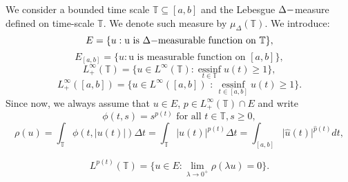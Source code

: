 \documentclass[12pt,a4paper,oneside,titlepage]{article}
\newcommand{\essinf}{\operatorname{essinf}\limits}
\begin{document}
We consider a bounded time scale $\mathbb{T} \subseteq [a,b]$ and the Lebesgue $\Delta \-- $measure defined on time-scale $\mathbb{T}$.
We denote such measure by $\mu_{\Delta}(\mathbb{T})$. We introduce:
\begin{equation}
\label{E_space}
E = \lbrace u :  \text{u is $\Delta \-- $measurable function on }   \mathbb{T} \rbrace ,
\end{equation}
\begin{equation}
 E_{[a,b]} = \lbrace u : \text{u is measurable function on } [a,b] \rbrace  ,
\end{equation}
\begin{equation}
\label{L_niesk}
 L^{\infty}_{+}(\mathbb{T}) = \lbrace u \in L^{\infty}({\mathbb{T}}):  \essinf_{t \in \mathbb{T}} u(t) \geq 1 \rbrace ,
\end{equation}
\begin{equation}
L^{\infty}_{+}([a,b]) = \lbrace   u \in L^{\infty}([a,b])   \text{ : } \essinf_{t \in [a,b]} u(t) \geq 1 \rbrace . 
\end{equation}
Since now, we always assume that $u \in E$, $p \in L^{\infty}_{+}(\mathbb{T}) \cap E$ and write
\begin{equation}
\label{phi}
\phi(t,s) =  s^{p(t)}    \text{ for all }    t \in \mathbb{T}, s \geq 0,
\end{equation}
\begin{equation}
\label{ro} 
\rho(u) =  \int_{\mathbb{T}} \phi(t, \vert u(t) \vert) \Delta t = \int_{\mathbb{T}} \vert u(t) \vert^{p(t)} \Delta t =\int_{[a,b]}  \vert \widehat{u}(t) \vert^{\widehat{p}(t)} dt ,    
\end{equation}

\begin{equation}
 L^{p(t)}({\mathbb{T}}) = \lbrace u \in E : \lim_{\lambda \rightarrow 0^{+}} \rho(\lambda u) = 0 \rbrace. 
 \end{equation}
\end{document}

